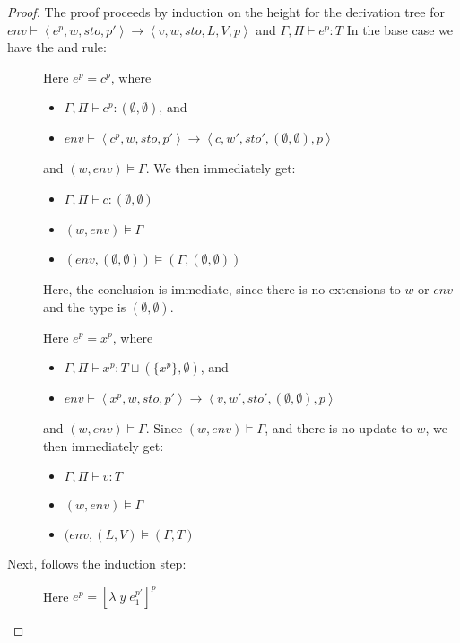 \documentclass[../../master.tex]{subfiles}
\begin{document}
\begin{proof}
	The proof proceeds by induction on the height for the derivation tree for $env\vdash\left\langle e^p,w,sto,p'\right\rangle\rightarrow\left\langle v,w,sto,L,V,p\right\rangle$ and $\Gamma,\Pi\vdash e^p:T$
	In the base case we have the  and  rule:
	\begin{description}
		\item[] Here $e^p=c^p$, where
			\begin{itemize}
				\item $\Gamma,\Pi\vdash c^p : (\emptyset,\emptyset)$, and 
				\item $env\vdash\left\langle c^p,w,sto,p'\right\rangle\rightarrow\left\langle c,w',sto',(\emptyset,\emptyset),p\right\rangle$
			\end{itemize}
			and $(w,env)\models\Gamma$.
			We then immediately get:
			\begin{itemize}
				\item $\Gamma,\Pi\vdash c : (\emptyset,\emptyset)$
				\item $(w,env)\models\Gamma$
				\item $(env,(\emptyset,\emptyset))\models (\Gamma,(\emptyset,\emptyset))$
			\end{itemize}
			Here, the conclusion is immediate, since there is no extensions to $w$ or $env$ and the type is $(\emptyset,\emptyset)$.

		\item[] Here $e^p=x^p$, where
			\begin{itemize}
				\item $\Gamma,\Pi\vdash x^p : T\sqcup (\{x^p\},\emptyset)$, and 
				\item $env\vdash\left\langle x^p,w,sto,p'\right\rangle\rightarrow\left\langle v,w',sto',(\emptyset,\emptyset),p\right\rangle$
			\end{itemize}
			and $(w,env)\models\Gamma$.
			Since $(w,env)\models\Gamma$, and there is no update to $w$, we then immediately get:
			\begin{itemize}
				\item $\Gamma,\Pi\vdash v : T$
				\item $(w,env)\models\Gamma$
				\item $(env,(L,V)\models (\Gamma,T)$
			\end{itemize}
	\end{description}

	Next, follows the induction step:
	\begin{description}
		\item[] Here $e^p=[\lambda\;y\;e_1^{p'}]^p$


\end{description}
\end{proof}
\end{document}
